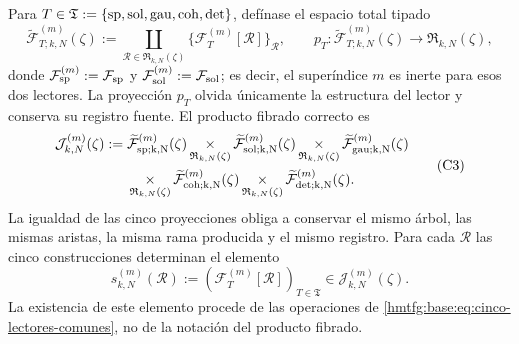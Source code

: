 Para
\(T\in\mathfrak T:=\{{\rm sp},{\rm sol},{\rm gau},{\rm coh},{\rm det}\}\),
defínase el espacio total tipado
\[
 \widetilde{\mathcal F}_{T;k,N}^{(m)}(\zeta)
 :=\coprod_{\mathscr R\in\mathfrak R_{k,N}(\zeta)}
   \{\mathcal F_T^{(m)}[\mathscr R]\}_{\mathscr R},
 \qquad
 p_T:\widetilde{\mathcal F}_{T;k,N}^{(m)}(\zeta)
      \longrightarrow\mathfrak R_{k,N}(\zeta),
\]
donde
\(\mathcal F_{\rm sp}^{(m)}:=\mathcal F_{\rm sp}\) y
\(\mathcal F_{\rm sol}^{(m)}:=\mathcal F_{\rm sol}\); es decir, el
superíndice \(m\) es inerte para esos dos lectores.
La proyección \(p_T\) olvida únicamente la estructura del lector y conserva
su registro fuente. El producto fibrado correcto es
\[
\begin{aligned}
 \mathcal J_{k,N}^{(m)}(\zeta):={}&
 \widetilde{\mathcal F}_{\rm sp;k,N}^{(m)}(\zeta)
 \mathop{\times}_{\mathfrak R_{k,N}(\zeta)}
 \widetilde{\mathcal F}_{\rm sol;k,N}^{(m)}(\zeta)
 \mathop{\times}_{\mathfrak R_{k,N}(\zeta)}
 \widetilde{\mathcal F}_{\rm gau;k,N}^{(m)}(\zeta)\\
 &\mathop{\times}_{\mathfrak R_{k,N}(\zeta)}
 \widetilde{\mathcal F}_{\rm coh;k,N}^{(m)}(\zeta)
 \mathop{\times}_{\mathfrak R_{k,N}(\zeta)}
 \widetilde{\mathcal F}_{\rm det;k,N}^{(m)}(\zeta).
\end{aligned}
\tag{C3}
\label{hmtfg:base:eq:constructor-correlativo}
\]
La igualdad de las cinco proyecciones obliga a conservar el mismo árbol, las
mismas aristas, la misma rama producida y el mismo registro. Para cada
\(\mathscr R\) las cinco construcciones determinan el elemento
\[
 s_{k,N}^{(m)}(\mathscr R)
 :=(\mathcal F_T^{(m)}[\mathscr R])_{T\in\mathfrak T}
 \in\mathcal J_{k,N}^{(m)}(\zeta).
\]
La existencia de este elemento procede de las operaciones de
\eqref{hmtfg:base:eq:cinco-lectores-comunes}, no de la
notación del producto fibrado.

